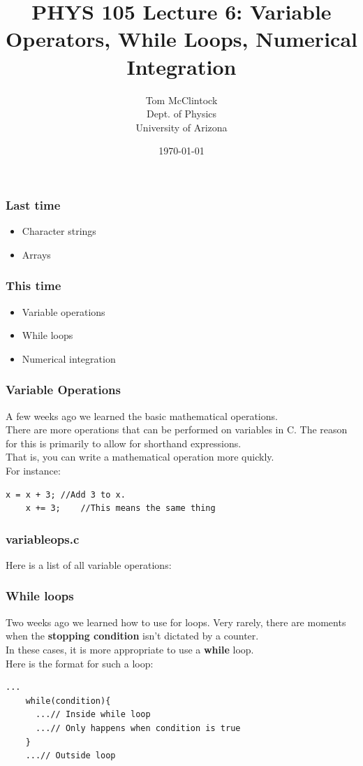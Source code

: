 \documentclass{beamer}
\title{PHYS 105 Lecture 6: Variable Operators, While Loops, 
  Numerical Integration}
\author{Tom McClintock \\
	Dept. of Physics\\
	University of Arizona
}
\date{\today}
\begin{document}
\begin{frame}
  \titlepage
\end{frame}

\begin{frame}
  \frametitle{Last time}
  \begin{itemize}
    \item Character strings
    \item Arrays
  \end{itemize}
\end{frame}

\begin{frame}
  \frametitle{This time}
  \begin{itemize}
    \item Variable operations
    \item While loops
    \item Numerical integration
  \end{itemize}
\end{frame}

\begin{frame}[fragile]
  \frametitle{Variable Operations}
  A few weeks ago we learned the basic mathematical operations.\\
  There are more operations that can be performed on variables in
  C. The reason for this is primarily to allow for shorthand expressions.\\
  That is, you can write a mathematical operation more quickly.\\
  For instance:
  \begin{lstlisting}[style=customc]
    x = x + 3; //Add 3 to x.
    x += 3;    //This means the same thing
  \end{lstlisting}
\end{frame}

\begin{frame}
  \frametitle{variableops.c}
  Here is a list of all variable operations:
  
\end{frame}

\begin{frame}[fragile]
  \frametitle{While loops}
  Two weeks ago we learned how to use for loops. Very rarely, there
  are moments when the \textbf{stopping condition} isn't dictated by
  a counter. \\
  In these cases, it is more appropriate to use a \textbf{while} loop.\\
  Here is the format for such a loop:
  \begin{lstlisting}[style=customc]
    ...
    while(condition){
      ...// Inside while loop
      ...// Only happens when condition is true
    }
    ...// Outside loop
  \end{lstlisting}
\end{frame}
\end{document}
